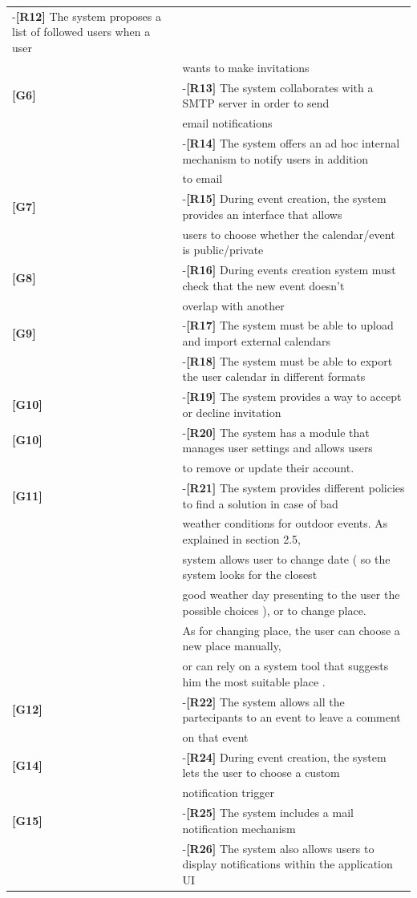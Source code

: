 \documentclass[12pt]{book}
\begin{document}
\begin{tabular}{ |l|l| }
					-\textbf{[R12]} The system proposes a list of followed users when a user \\ &wants to make invitations\\
			\textbf{[G6]} & 
					-\textbf{[R13]} The system collaborates with a SMTP server in order to send\\& email notifications\\&
					-\textbf{[R14]} The system offers an ad hoc internal mechanism to notify users in addition\\& to email \\  
			\textbf{[G7]} & 
					-\textbf{[R15]} During event creation, the system provides an interface that allows\\& users to choose whether the calendar/event is public/private\\
			\textbf{[G8]} &
					-\textbf{[R16]} During events creation system must check that the new event doesn't\\& overlap with another\\
			\textbf{[G9]} &
					-\textbf{[R17]} The system must be able to upload and import external calendars\\& 
					-\textbf{[R18]} The system must be able to export the user calendar in different formats\\ 			\textbf{[G10]} &
					-\textbf{[R19]} The system provides a way to accept or decline invitation\\
			\textbf{[G10]} &
					-\textbf{[R20]} The system has a module that manages user settings and allows users\\& to remove or update their account.   \\
			\textbf{[G11]} &
					-\textbf{[R21]} The system provides different policies to find a solution in case of bad\\& weather conditions for outdoor events. As explained in section 2.5,\\& system allows user to change date ( so the system looks for the closest \\& good weather day presenting to the user the possible choices ), or to change place.  \\ &As for changing place, the user can choose a new place manually, \\ & or can rely on a system tool that suggests him the most suitable place . \\
			\textbf{[G12]} &
					-\textbf{[R22]} The system allows all the partecipants to an event to leave a comment\\& on that event\\
			\textbf{[G14]} &
					-\textbf{[R24]} During event creation, the system lets the user to choose a custom \\& notification trigger \\
			\textbf{[G15]} &
					-\textbf{[R25]} The system includes a mail notification mechanism\\&
					-\textbf{[R26]} The system also allows users to display notifications within the application UI\\
  		\hline 
  		\hline
	\end{tabular} \\
\end{document}
